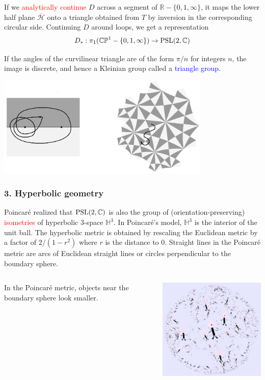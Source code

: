 \documentclass{beamer}
\def\R{\mathbb{R}}
\def\H{\mathbb{H}}
\def\HH{\mathcal{H}}
\def\CP{\mathbb{CP}}
\def\C{\mathbb{C}}
\def\PSL{\textnormal{PSL}}
\begin{document}
\frame
{
If we \textcolor{red}{analytically continue} $D$ across a segment of 
$\R - \lbrace 0,1,\infty\rbrace$, it maps
the lower half plane $\overline{\HH}$ onto a triangle obtained from $T$ by \textcolor{dgreen}{inversion}
in the corresponding circular side. 
\vskip 10pt
Continuing $D$ around loops, we get a
representation 
$$D_*:\pi_1(\CP^1 - \lbrace 0,1,\infty\rbrace) \to \PSL(2,\C)$$ 
}
\frame
{
If the angles of the curvilinear triangle are of the form $\pi/n$ for integers $n$, 
the image is discrete, and hence a Kleinian group
called a \textcolor{blue}{triangle group}.
\begin{center}
\includegraphics[width=4in]{triangle_group.png}
\end{center}
}
\frame
{
\frametitle{3. Hyperbolic geometry}
Poincar\'e realized that $\PSL(2,\C)$ is also the group
of (orientation-preserving) \textcolor{red}{isometries} of hyperbolic 3-space $\H^3$.
\vskip 10pt
In Poincar\'e's model, $\H^3$ is the interior of the unit ball.
The hyperbolic metric is obtained by rescaling the Euclidean metric
by a factor of $2/(1-r^2)$ where $r$ is the distance to $0$.
\vskip 10pt
Straight lines in the Poincar\'e metric are arcs of Euclidean
straight lines or circles perpendicular to the boundary sphere.
}
\frame
{
\begin{columns}[c]
\column{1.1in}
In the Poincar\'e
metric, objects near the
boundary sphere look
smaller.
\column{3in}
\begin{center}
\includegraphics[width=3in]{Poincare.png}
\end{center}
\end{columns}
}
\end{document}
